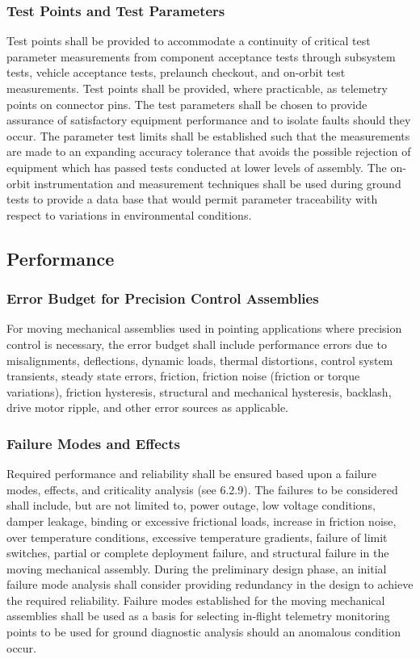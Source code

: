 \documentclass[12pt]{article}
\begin{document}
\subsubsection{Test Points and Test Parameters} %
Test points shall be provided to accommodate a continuity of critical test parameter measurements from component acceptance tests through subsystem tests, vehicle acceptance tests, prelaunch checkout, and on-orbit test measurements. 
Test points shall be provided, where practicable, as telemetry points on connector pins. 
The test parameters shall be chosen to provide assurance of satisfactory equipment performance and to isolate faults should they occur. 
The parameter test limits shall be established such that the measurements are made to an expanding accuracy tolerance that avoids the possible rejection of equipment which has passed tests conducted at lower levels of assembly. 
The on-orbit instrumentation and measurement techniques shall be used during ground tests to provide a data base that would permit parameter traceability with respect to variations in environmental conditions.

\subsection{Performance} %
\subsubsection{Error Budget for Precision Control Assemblies} %
For moving mechanical assemblies used in pointing applications where precision control is necessary, the error budget shall include performance errors due to misalignments, deflections, dynamic loads, thermal distortions, control system transients, steady state errors, friction, friction noise (friction or torque variations), friction hysteresis, structural and mechanical hysteresis, backlash, drive motor ripple, and other error sources as applicable.

\subsubsection{Failure Modes and Effects} %
Required performance and reliability shall be ensured based upon a failure modes, effects, and criticality analysis (see 6.2.9). 
The failures to be considered shall include, but are not limited to, power outage, low voltage conditions, damper leakage, binding or excessive frictional loads, increase in friction noise, over temperature conditions, excessive temperature gradients, failure of limit switches, partial or complete deployment failure, and structural failure in the moving mechanical assembly. 
During the preliminary design phase, an initial failure mode analysis shall consider providing redundancy in the design to achieve the required reliability. 
Failure modes established for the moving mechanical assemblies shall be used as a basis for selecting in-flight telemetry monitoring points to be used for ground diagnostic analysis should an anomalous condition occur.
\end{document}
